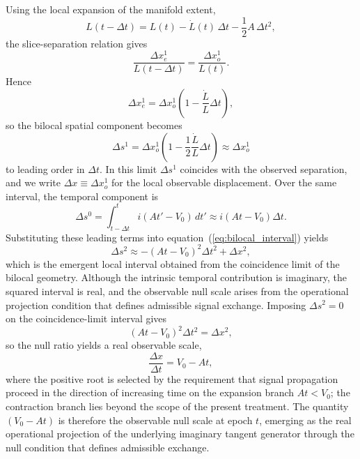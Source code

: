 \documentclass[fontsize=12pt, paper=a4]{scrartcl}
\begin{document}
Using the local expansion of the manifold extent,
\[
L(t-\Delta t)=L(t)-\dot L(t)\,\Delta t-\frac{1}{2}A\,\Delta t^2,
\]
the slice-separation relation gives
\begin{equation}
\frac{\Delta x_e^1}{L(t-\Delta t)}=\frac{\Delta x_o^1}{L(t)} .
\end{equation}
Hence
\begin{equation}
\Delta x_e^1=\Delta x_o^1\left(1-\frac{\dot L}{L}\Delta t\right),
\end{equation}
so the bilocal spatial component becomes
\begin{equation}
\Delta s^1=\Delta x_o^1\left(1-\frac{1}{2}\frac{\dot L}{L}\Delta t\right)\approx \Delta x_o^1
\end{equation}
to leading order in $\Delta t$. In this limit $\Delta s^1$ coincides with the observed separation, and we write $\Delta x \equiv \Delta x_o^1$ for the local observable displacement. Over the same interval, the temporal component is
\begin{equation}
\Delta s^0=\int_{t-\Delta t}^{t} i\left(A t' - V_0\right)\,dt' \approx i\left(At-V_0\right)\Delta t.
\end{equation}
Substituting these leading terms into equation~(\ref{eq:bilocal_interval}) yields
\begin{equation}
\Delta s^2 \approx -\left(At-V_0\right)^2\Delta t^2 + \Delta x^2 ,
\label{eq:local_interval}
\end{equation}
which is the emergent local interval obtained from the coincidence limit of the bilocal geometry. Although the intrinsic temporal contribution is imaginary, the squared interval is real, and the observable null scale arises from the operational projection condition that defines admissible signal exchange. Imposing $\Delta s^2 = 0$ on the coincidence-limit interval gives
\begin{equation}
\left(At-V_0\right)^2 \Delta t^2 = \Delta x^2 ,
\end{equation}
so the null ratio yields a real observable scale,
\begin{equation}
\frac{\Delta x}{\Delta t} = V_0 - At ,
\label{eq:real_tangent_scale}
\end{equation}
where the positive root is selected by the requirement that signal propagation proceed in the direction of increasing time on the expansion branch $At < V_0$; the contraction branch lies beyond the scope of the present treatment. The quantity $(V_0-At)$ is therefore the observable null scale at epoch $t$, emerging as the real operational projection of the underlying imaginary tangent generator through the null condition that defines admissible exchange.
\end{document}
